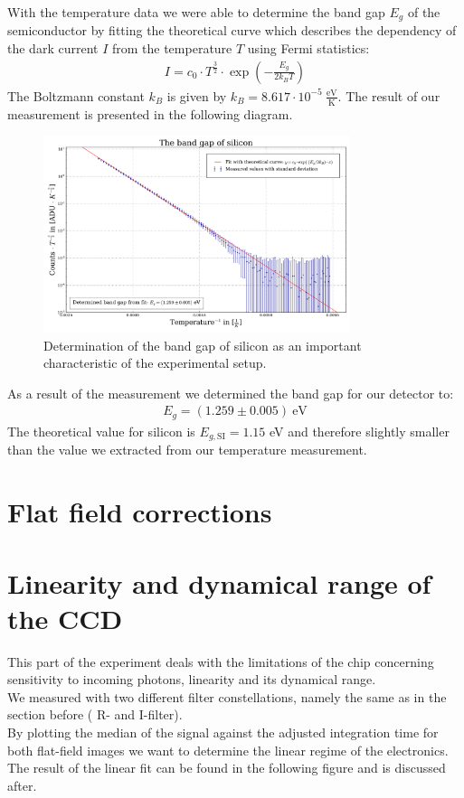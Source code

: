 With  the temperature data we were able to determine the band gap $E_g$ of the semiconductor by fitting the theoretical curve which describes the dependency of the dark current $I$ from the temperature $T$ using Fermi statistics:
\begin{align}
	I = c_0 \cdot T^{\frac{3}{2}}\cdot\exp(-\frac{E_g}{2 k_B T})
\end{align}
The Boltzmann constant $k_B$ is given by $k_B = 8.617 \cdot 10^{-5} \ \frac{\text{eV}}{\text{K}}$.
The result of our measurement is presented in the following diagram.
\begin{figure}[H]
\centering
\includegraphics[width=0.8\textwidth]{figures/Plots/band_gap.pdf}
\caption{Determination of the band gap of silicon as an important characteristic of the experimental setup.}	
\end{figure}
As a result of the measurement we determined the band gap for our detector to:
\begin{align}
	E_g = (1.259 \pm 0.005) \ \text{eV}
\end{align}
The theoretical value for silicon is $E_{g, \text{SI}} = 1.15$ eV and therefore slightly smaller than the value we extracted from our temperature measurement. %

\section{Flat field corrections}


\section{Linearity and dynamical range of the CCD}

This part of the experiment deals with the limitations of the chip concerning sensitivity to incoming photons, linearity and its dynamical range. \\
We measured with two different filter constellations, namely the same as in the section before ( R- and I-filter). \\
By plotting the median of the signal against the adjusted integration time for both flat-field images we want to determine the linear regime of the electronics. \\
The result of the linear fit can be found in the following figure and is discussed after.

